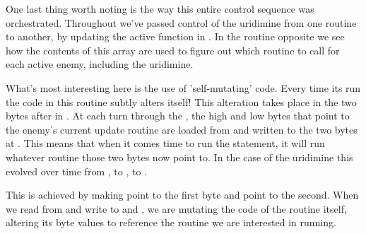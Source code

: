 One last thing worth noting is the way this entire control sequence was orchestrated. Throughout we've
passed control of the uridimine from one routine to another, by updating the active function in 
. In the  routine opposite we see how the contents
of this array are used to figure out which routine to call for each active enemy, including the uridimine.

What's most interesting here is the use of 'self-mutating' code. Every time its run the code in this routine
subtly alters itself!
This alteration takes place in the two bytes after  in . At each
turn through the , the high and low bytes that point to the enemy's current update
routine are loaded from  and written to the two bytes at .
This means that when it comes time to run the  statement, it will run whatever routine those two
bytes now point to. In the case of the uridimine this evolved over time from , to
, to .

This is achieved by making  point to the first byte and  point to the
second. When we read from  and write to  and , 
we are mutating the code of the routine itself, altering its byte values to reference the routine we are interested
in running.

